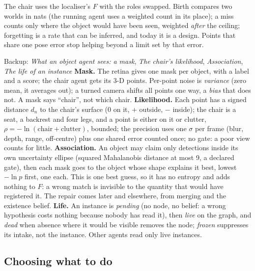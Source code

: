 \documentclass[11pt]{article}
\begin{document}
\begin{keyidea}
The chair uses the localiser's $F$ with the roles swapped. Birth compares two worlds in nats (the running agent uses a weighted count in its place); a miss counts only where the object would have been seen, weighted \emph{after} the ceiling; forgetting is a rate that can be inferred, and today it is a design. Points that share one pose error stop helping beyond a limit set by that error.
\end{keyidea}

\begin{backupbox}{Backup: \emph{What an object agent sees: a mask}, \emph{The chair's likelihood}, \emph{Association}, \emph{The life of an instance}}
\textbf{Mask.} The retina gives one mask per object, with a label and a score; the chair agent gets its 3-D points. Per-point noise is \emph{variance} (zero mean, it averages out); a turned camera shifts all points one way, a \emph{bias} that does not. A mask says ``chair'', not which chair. \textbf{Likelihood.} Each point has a signed distance $d_n$ to the chair's surface (0 on it, $+$ outside, $-$ inside); the chair is a seat, a backrest and four legs, and a point is either on it or clutter, $\rho=-\ln(\text{chair}+\text{clutter})$, bounded; the precision uses one $\sigma$ per frame (blur, depth, range, off-centre) plus one shared error counted once; no gate: a poor view counts for little. \textbf{Association.} An object may claim only detections inside its own uncertainty ellipse (squared Mahalanobis distance at most 9, a declared gate), then each mask goes to the object whose shape explains it best, lowest $-\ln p$ first, one each. This is one best guess, so it has no entropy and adds nothing to $F$: a wrong match is invisible to the quantity that would have registered it. The repair comes later and elsewhere, from merging and the existence belief. \textbf{Life.} An instance is \emph{pending} (no node, no belief: a wrong hypothesis costs nothing because nobody has read it), then \emph{live} on the graph, and \emph{dead} when absence where it would be visible removes the node; \emph{frozen} suppresses its intake, not the instance. Other agents read only live instances.
\end{backupbox}

\subsection{Choosing what to do}
\end{document}
